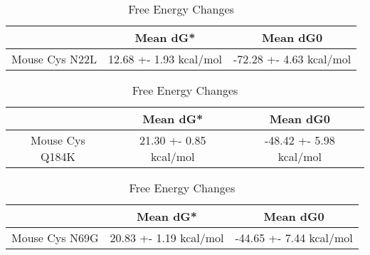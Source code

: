                                         \begin{table}[ht]
                                          \centering
                                          \begin{tabular}{|c|c|c|}
                                          \hline
                                            & Mean dG* & Mean dG0 \\
                                          \hline
                                     Mouse Cys N22L & 12.68 +- 1.93 kcal/mol & -72.28 +- 4.63 kcal/mol \\
                                          \hline
                                          \end{tabular}
                                          \caption{Free Energy Changes}
                                          \end{table}



                                          \begin{table}[ht]
                                            \centering
                                            \begin{tabular}{|c|c|c|}
                                            \hline
                                              & Mean dG* & Mean dG0 \\
                                            \hline
                                        Mouse Cys Q184K & 21.30 +- 0.85 kcal/mol & -48.42 +- 5.98 kcal/mol \\
                                            \hline
                                            \end{tabular}
                                            \caption{Free Energy Changes}
                                            \end{table}
                                            
                                            \begin{table}[ht]
                                              \centering
                                              \begin{tabular}{|c|c|c|}
                                              \hline
                                                & Mean dG* & Mean dG0 \\
                                              \hline
                                         Mouse Cys N69G & 20.83 +- 1.19 kcal/mol & -44.65 +- 7.44 kcal/mol \\
                                              \hline
                                              \end{tabular}
                                              \caption{Free Energy Changes}
                                              \end{table}
                                              

